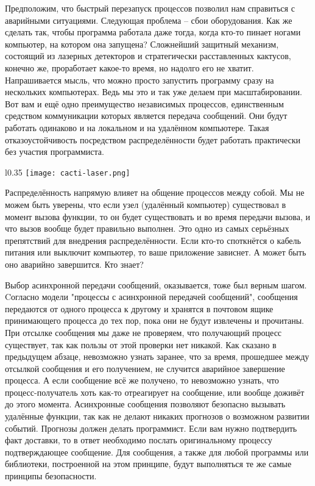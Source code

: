 Предположим, что быстрый перезапуск процессов позволил нам справиться с аварийными ситуациями.
Следующая проблема \--- сбои оборудования.
Как же сделать так, чтобы программа работала даже тогда, когда кто\--то пинает ногами компьютер, на котором она запущена?
Сложнейший защитный механизм, состоящий из лазерных детекторов и стратегически расставленных кактусов, конечно же, проработает какое\--то время, но надолго его не хватит.
Напрашивается мысль, что можно просто запустить программу сразу на нескольких компьютерах.
Ведь мы это и так уже делаем при масштабировании.
Вот вам и ещё одно преимущество независимых процессов, единственным средством коммуникации которых является передача сообщений.
Они будут работать одинаково и на локальном и на удалённом компьютере.
Такая отказоустойчивость посредством распределённости будет работать практически без участия программиста.
\begin{wrapfigure}{l}{0.35\linewidth}
    \texttt{[image: cacti-laser.png]}
\end{wrapfigure}

Распределённость напрямую влияет на общение процессов между собой.
Мы не можем быть уверены, что если узел (удалённый компьютер) существовал в момент вызова функции, то он будет существовать и во время передачи вызова, и что вызов вообще будет правильно выполнен.
Это одно из самых серьёзных препятствий для внедрения распределённости.
Если кто\--то споткнётся о кабель питания или выключит компьютер, то ваше приложение зависнет.
А может быть оно аварийно завершится.
Кто знает?

Выбор асинхронной передачи сообщений, оказывается, тоже был верным шагом.
Cогласно модели "процессы с асинхронной передачей сообщений", сообщения передаются от одного процесса к другому и хранятся в почтовом ящике принимающего процесса до тех пор, пока они не будут извлечены и прочитаны.
При отсылке сообщения мы даже не проверяем, что получающий процесс существует, так как пользы от этой проверки нет никакой.
Как сказано в предыдущем абзаце, невозможно узнать заранее, что за время, прошедшее между отсылкой сообщения и его получением, не случится аварийное завершение процесса.
А если сообщение всё же получено, то невозможно узнать, что процесс\--получатель хоть как\--то отреагирует на сообщение, или вообще доживёт до этого момента.
Асинхронные сообщения позволяют безопасно вызывать удалённые функции, так как не делают никаких прогнозов о возможном развитии событий.
Прогнозы  должен делать программист.
Если вам нужно подтвердить факт доставки, то в ответ необходимо послать оригинальному процессу подтверждающее сообщение.
Для сообщения, а также для любой программы или библиотеки, построенной на этом принципе, будут выполняться те же самые принципы безопасности.
